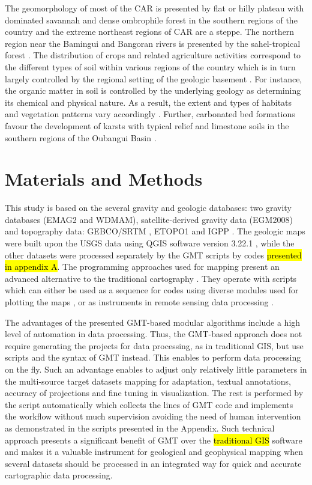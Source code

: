 \documentclass[minerals,article,submit,pdftex,moreauthors]{Definitions/mdpi}
\begin{document}
The geomorphology of most of the CAR is presented by flat or hilly plateau with dominated savannah \cite{Nguimalet} and dense ombrophile forest in the southern regions of the country \cite{Suchel} and the extreme northeast regions of CAR are a steppe. The northern region near the Bamingui  and Bangoran rivers is presented by the sahel-tropical forest \cite{Spinage1988}. The distribution of crops and related agriculture activities correspond to the different types of soil within various regions of the country which is in turn largely controlled by the regional setting of the geologic basement \cite{Villien1988,Quantin1965,Prioul}. For instance, the organic matter in soil is controlled by the underlying geology as determining its chemical and physical nature. As a result, the extent and types of habitats and vegetation patterns vary accordingly \cite{CombeauQuantin,Quantin1962}. Further, carbonated bed formations favour the development of karsts with typical relief and limestone soils in the southern regions of the Oubangui Basin \cite{Salomon}.

\section{Materials and Methods}
This study is based on the several gravity and geologic databases: two gravity databases (EMAG2 and WDMAM), satellite-derived gravity data (EGM2008) and topography data: GEBCO/SRTM \cite{GEBCO,SRTM}, ETOPO1 \cite{NOAA} and IGPP \cite{SANDWELL20211059,Pavlis}. The geologic maps were built upon the USGS data using QGIS software version 3.22.1 \cite{QGIS_software}, while the other datasets were processed separately by the GMT scripts by codes \hl{presented in appendix A}. The programming approaches used for mapping present an advanced alternative to the traditional cartography \cite{TRAORE2020103933,RUNGE2005311,TRAORE2021100114}. They operate with scripts which can either be used as a sequence for codes using diverse modules used for plotting the maps \cite{4814952,Lemenkova202230,8588718,Lemenkova202228}, or as instruments in remote sensing data processing \cite{9964623,Lemenkova202229,7577632,Lemenkova202227}.

The advantages of the presented GMT-based modular algorithms include a high level of automation in data processing. Thus, the GMT-based approach does not require generating the projects for data processing, as in traditional GIS, but use scripts and the syntax of GMT instead. This enables to perform data processing on the fly. Such an advantage enables to adjust only relatively little parameters in the multi-source target datasets mapping for adaptation, textual annotations, accuracy of projections and fine tuning in visualization. The rest is performed by the script automatically which collects the lines of GMT code and implements the workflow without much supervision avoiding the need of human intervention as demonstrated in the scripts presented in the Appendix. Such technical approach presents a significant benefit of GMT over the \hl{traditional GIS} software and makes it a valuable instrument for geological and geophysical mapping when several datasets should be processed in an integrated way for quick and accurate cartographic data processing.
\end{document}
